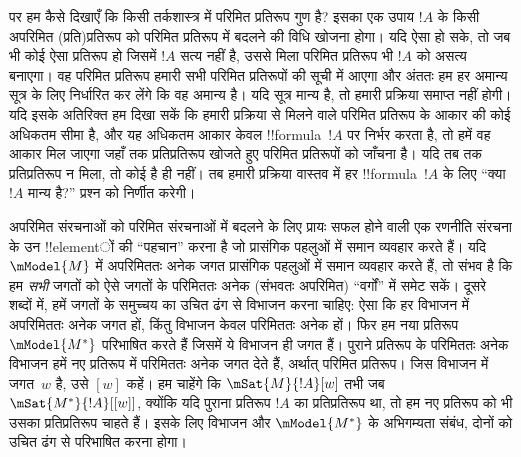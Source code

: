 \documentclass[../../../include/open-logic-section]{subfiles}
\begin{document}
पर हम कैसे दिखाएँ कि किसी तर्कशास्त्र में परिमित प्रतिरूप गुण है? इसका एक
उपाय $!A$ के किसी अपरिमित (प्रति)प्रतिरूप को परिमित प्रतिरूप में बदलने की
विधि खोजना होगा। यदि ऐसा हो सके, तो जब भी कोई ऐसा प्रतिरूप हो जिसमें $!A$
सत्य नहीं है, उससे मिला परिमित प्रतिरूप भी $!A$ को असत्य बनाएगा। वह
परिमित प्रतिरूप हमारी सभी परिमित प्रतिरूपों की सूची में आएगा और अंततः हम
हर अमान्य सूत्र के लिए निर्धारित कर लेंगे कि वह अमान्य है। यदि सूत्र मान्य
है, तो हमारी प्रक्रिया समाप्त नहीं होगी। यदि इसके अतिरिक्त हम दिखा सकें
कि हमारी प्रक्रिया से मिलने वाले परिमित प्रतिरूप के आकार की कोई अधिकतम
सीमा है, और यह अधिकतम आकार केवल !!{formula}~$!A$ पर निर्भर करता है, तो हमें
वह आकार मिल जाएगा जहाँ तक प्रतिप्रतिरूप खोजते हुए परिमित प्रतिरूपों को
जाँचना है। यदि तब तक प्रतिप्रतिरूप न मिला, तो कोई है ही नहीं। तब हमारी
प्रक्रिया वास्तव में हर !!{formula}~$!A$ के लिए ``क्या $!A$ मान्य है?''
प्रश्न को निर्णीत करेगी।

अपरिमित संरचनाओं को परिमित संरचनाओं में बदलने के लिए प्रायः सफल होने वाली
एक रणनीति संरचना के उन !!{element}ों की ``पहचान'' करना है जो प्रासंगिक
पहलुओं में समान व्यवहार करते हैं। यदि $\mModel{M}$ में अपरिमिततः अनेक जगत
प्रासंगिक पहलुओं में समान व्यवहार करते हैं, तो संभव है कि हम \emph{सभी}
जगतों को ऐसे जगतों के परिमिततः अनेक (संभवतः अपरिमित) ``वर्गों'' में समेट
सकें। दूसरे शब्दों में, हमें जगतों के समुच्चय का उचित ढंग से विभाजन करना
चाहिए: ऐसा कि हर विभाजन में अपरिमिततः अनेक जगत हों, किंतु विभाजन केवल
परिमिततः अनेक हों। फिर हम नया प्रतिरूप~$\mModel{M^*}$ परिभाषित करते हैं
जिसमें ये विभाजन ही जगत हैं। पुराने प्रतिरूप के परिमिततः अनेक विभाजन हमें
नए प्रतिरूप में परिमिततः अनेक जगत देते हैं, अर्थात् परिमित प्रतिरूप। जिस
विभाजन में जगत~$w$ है, उसे $[w]$ कहें। हम चाहेंगे कि
$\mSat{M}{!A}[w]$ तभी जब $\mSat{M^*}{!A}[{[w]}]$, क्योंकि यदि पुराना
प्रतिरूप $!A$ का प्रतिप्रतिरूप था, तो हम नए प्रतिरूप को भी उसका
प्रतिप्रतिरूप चाहते हैं। इसके लिए विभाजन और $\mModel{M^*}$ के अभिगम्यता
संबंध, दोनों को उचित ढंग से परिभाषित करना होगा।
\end{document}
